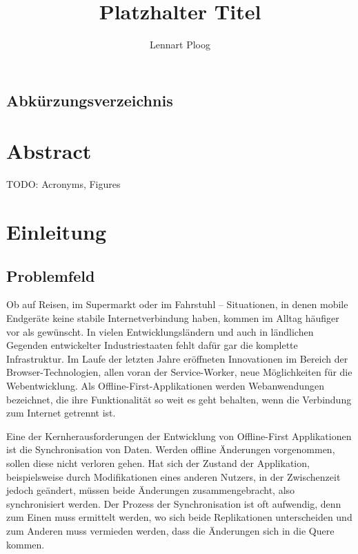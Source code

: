 \documentclass[a4paper, 12pt]{scrreprt}
\title{Platzhalter Titel}
\subtitle{}
\author{Lennart Ploog}
\begin{document}
	\maketitle
	\newpage
	\tableofcontents
	\newpage
\section*{Abkürzungsverzeichnis}
	\begin{acronym}[Bash]
	\end{acronym}
\chapter{Abstract}
TODO: Acronyms, Figures
\chapter{Einleitung}\label{sec:Einleitung}
\section{Problemfeld}\label{sec:Problemfeld}
Ob auf Reisen, im Supermarkt oder im Fahrstuhl -- Situationen, in denen mobile Endgeräte keine stabile Internetverbindung haben, kommen im Alltag häufiger vor als gewünscht. In vielen Entwicklungsländern und auch in ländlichen Gegenden entwickelter Industriestaaten fehlt dafür gar die komplette Infrastruktur. Im Laufe der letzten Jahre eröffneten Innovationen im Bereich der Browser-Technologien, allen voran der Service-Worker, neue Möglichkeiten für die Webentwicklung. Als Offline-First-Applikationen werden Webanwendungen bezeichnet, die ihre Funktionalität so weit es geht behalten, wenn die Verbindung zum Internet getrennt ist.

Eine der Kernherausforderungen der Entwicklung von Offline-First Applikationen ist die Synchronisation von Daten. Werden offline Änderungen vorgenommen, sollen diese nicht verloren gehen. Hat sich der Zustand der Applikation, beispielsweise durch Modifikationen eines anderen Nutzers, in der Zwischenzeit jedoch geändert, müssen beide Änderungen zusammengebracht, also synchronisiert werden. Der Prozess der Synchronisation ist oft aufwendig, denn zum Einen muss ermittelt werden, wo sich beide Replikationen unterscheiden und zum Anderen muss vermieden werden, dass die Änderungen sich in die Quere kommen. 
\end{document}
